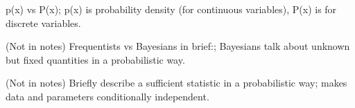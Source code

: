 \documentclass{article}
\begin{document}
p(x) vs P(x); p(x) is probability density (for continuous variables), P(x) is for discrete variables.

(Not in notes) Frequentists vs Bayesians in brief:; Bayesians talk about unknown but fixed quantities in a probabilistic way.

(Not in notes) Briefly describe a sufficient statistic in a probabilistic way; makes data and parameters conditionally independent.
\end{document}
